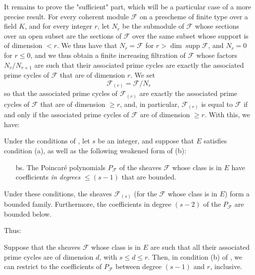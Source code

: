   It remains to prove the "sufficient" part, which will be a particular case of a more precise result.
  For every coherent module $\mathcal{F}$ on a prescheme of finite type over a field $K$, and for every integer $r$, let $N_r$ be the submodule of $\mathcal{F}$ whose sections over an open subset are the sections of $\mathcal{F}$ over the same subset whose support is of dimension $<r$.
  We thus have that $N_r=\mathcal{F}$ for $r>\dim\operatorname{supp}\mathcal{F}$, and $N_r=0$ for $r\leqslant0$, and we thus obtain a finite increasing filtration of $\mathcal{F}$ whose factors $N_r/N_{r+1}$ are such that their associated prime cycles are exactly the associated prime cycles of $\mathcal{F}$ that are of dimension $r$.
  We set
  \[
    \mathcal{F}_{(r)}
    = \mathcal{F}/N_r
  \]
  so that the associated prime cycles of $\mathcal{F}_{(r)}$ are exactly the associated prime cycles of $\mathcal{F}$ that are of dimension $\geqslant r$, and, in particular, $\mathcal{F}_{(r)}$ is equal to $\mathcal{F}$ if and only if the associated prime cycles of $\mathcal{F}$ are of dimension $\geqslant r$.
  With this, we have:

  \begin{theorem}\label{fga3.iv-2-theorem-2.2}
    Under the conditions of , let $s$ be an integer, and suppose that $E$ satisfies condition (a), as well as the following weakened form of (b):

    \begin{enumerate}
      \item[bs.] The Poincaré polynomials $P_\mathcal{F}$ of the sheaves $\mathcal{F}$ whose class is in $E$ have coefficients \emph{in degrees $\leqslant (s-1)$} that are bounded.
    \end{enumerate}

    Under these conditions, the sheaves $\mathcal{F}_{(s)}$ (for the $\mathcal{F}$ whose class is in $E$) form a bounded family.
    Furthermore, the coefficients in degree $(s-2)$ of the $P_\mathcal{F}$ are bounded below.
  \end{theorem}

  Thus:

  \begin{corollary}\label{fga3.iv-2-corollary-2.3}
    Suppose that the sheaves $\mathcal{F}$ whose class is in $E$ are such that all their associated prime cycles are of dimension $d$, with $s\leqslant d\leqslant r$.
    Then, in condition (b) of , we can restrict to the coefficients of $P_\mathcal{F}$ between degree $(s-1)$ and $r$, inclusive.
  \end{corollary}

